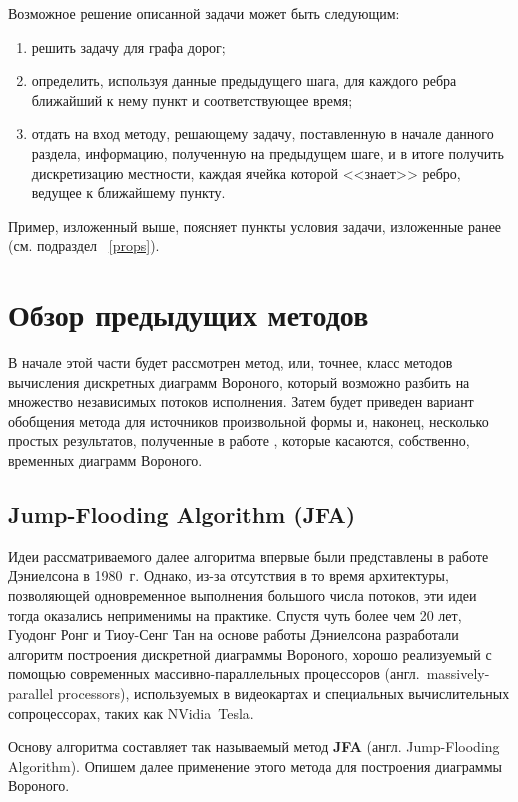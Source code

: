 \documentclass[12pt]{article}
\begin{document}
Возможное решение описанной задачи может быть следующим:
\begin{enumerate}
\item решить задачу для графа дорог;
\item определить, используя данные предыдущего шага, для каждого ребра 
ближайший к нему пункт и соответствующее время;
\item отдать на вход методу, решающему задачу, поставленную в начале
данного раздела, информацию, полученную на предыдущем шаге,
и в итоге получить дискретизацию местности, каждая ячейка которой
<<знает>> ребро, ведущее к ближайшему пункту.
\end{enumerate}

Пример, изложенный выше, поясняет пункты условия задачи, изложенные ранее 
(см. подраздел ~\ref{props}).

\section{Обзор предыдущих методов}
\label{past}
В начале этой части будет рассмотрен метод, или, точнее, класс методов
вычисления дискретных диаграмм Вороного, который возможно разбить
на множество независимых потоков исполнения. Затем будет приведен
вариант обобщения метода для источников произвольной формы и, 
наконец, несколько простых результатов, полученные в работе \cite{timeb}, 
которые касаются, собственно, временных диаграмм Вороного.

\subsection{Jump-Flooding Algorithm (JFA)}
\label{jfa_desc}
Идеи рассматриваемого далее алгоритма впервые были представлены в работе
Дэниелсона \cite{distmap} в 1980~г. Однако, из-за отсутствия в то время
архитектуры, позволяющей одновременное выполнения большого числа потоков,
эти идеи тогда оказались неприменимы на практике. Спустя чуть более чем 20 лет, 
Гуодонг Ронг и Тиоу-Сенг Тан \cite{jfa} на основе работы Дэниелсона разработали 
алгоритм построения дискретной диаграммы Вороного, хорошо реализуемый
с помощью современных массивно-параллельных процессоров 
(англ.~massively-parallel processors), используемых в видеокартах и
специальных вычислительных сопроцессорах, таких как NVidia\textregistered \, 
Tesla\texttrademark.


Основу алгоритма составляет так называемый метод \textbf{JFA} (англ.
Jump-Flooding Algorithm). Опишем далее применение этого метода для 
построения диаграммы Вороного. 
\end{document}
